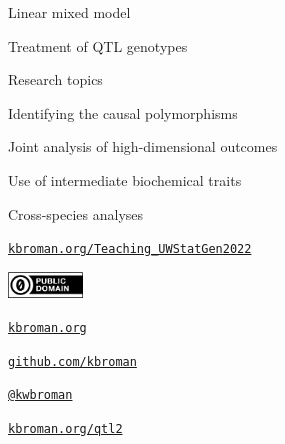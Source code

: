 \documentclass[aspectratio=169,12pt,t]{beamer}
\begin{document}
\begin{frame}{Linear mixed model}

\end{frame}



\begin{frame}{Treatment of QTL genotypes}

\end{frame}



\begin{frame}{Research topics}

  \bbi
\item Identifying the causal polymorphisms
\item Joint analysis of high-dimensional outcomes
\item Use of intermediate biochemical traits
\item Cross-species analyses
  \ei

\end{frame}



\begin{frame}[c]{}

\Large

\href{https://kbroman.org/Teaching_UWStatGen2022}{\tt kbroman.org/Teaching\_UWStatGen2022}

\vspace*{-7mm}
\hfill
\href{https://creativecommons.org/publicdomain/zero/1.0/}{\includegraphics[height=7mm]{Figs/cc-zero.png}}

\vspace{3mm}

\href{https://kbroman.org}{\tt \lolit kbroman.org}

\vspace{4mm}

\href{https://github.com/kbroman}{\tt \lolit github.com/kbroman}

\vspace{4mm}

\href{https://twitter.com/kwbroman}{\tt \lolit @kwbroman}

\vspace{4mm}

\href{https://kbroman.org/qtl2}{\tt \lolit kbroman.org/qtl2}





\end{frame}
\end{document}

